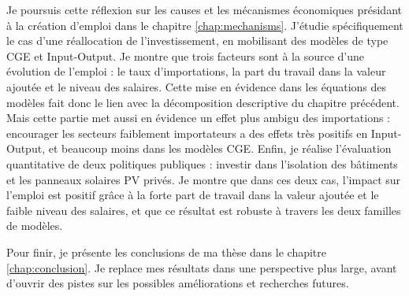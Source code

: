 Je poursuis cette réflexion sur les causes et les mécanismes économiques présidant à la création d'emploi dans le chapitre \ref{chap:mechanisms}. J'étudie spécifiquement le cas d'une réallocation de l'investissement, en mobilisant des modèles de type CGE et Input-Output. Je montre que trois facteurs sont à la source d'une évolution de l'emploi : le taux d'importations, la part du travail dans la valeur ajoutée et le niveau des salaires. Cette mise en évidence dans les équations des modèles fait donc le lien avec la décomposition descriptive du chapitre précédent. Mais cette partie met aussi en évidence un effet plus ambigu des importations : encourager les secteurs faiblement importateurs a des effets très positifs en Input-Output, et beaucoup moins dans les modèles CGE. Enfin, je réalise l'évaluation quantitative de deux politiques publiques : investir dans l'isolation des bâtiments et les panneaux solaires PV privés. Je montre que dans ces deux cas, l'impact sur l'emploi est positif grâce à la forte part de travail dans la valeur ajoutée et le faible niveau des salaires, et que ce résultat est robuste à travers les deux familles de modèles. 

Pour finir, je présente les conclusions de ma thèse dans le chapitre \ref{chap:conclusion}. Je replace mes résultats dans une perspective plus large, avant d'ouvrir des pistes sur les possibles améliorations et recherches futures.





